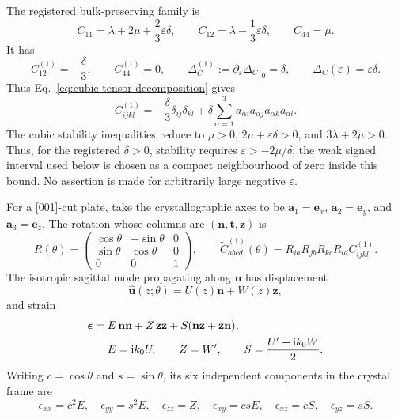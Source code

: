 The registered bulk-preserving family is
\begin{equation}
  C_{11}=\lambda+2\mu+\frac{2}{3}\varepsilon\delta,
  \qquad
  C_{12}=\lambda-\frac{1}{3}\varepsilon\delta,
  \qquad
  C_{44}=\mu.
  \label{eq:registered-cubic-family}
\end{equation}
It has
\begin{equation}
  C_{12}^{(1)}=-\frac{\delta}{3},
  \qquad
  C_{44}^{(1)}=0,
  \qquad
  \Delta_C^{(1)}
  :=\left.\partial_\varepsilon\Delta_C\right|_0=\delta,
  \qquad
  \Delta_C(\varepsilon)=\varepsilon\delta.
  \label{eq:cubic-family-derivatives}
\end{equation}
Thus Eq.~\eqref{eq:cubic-tensor-decomposition} gives
\begin{equation}
  C^{(1)}_{ijkl}
  =-\frac{\delta}{3}\delta_{ij}\delta_{kl}
   +\delta\sum_{\alpha=1}^{3}
      a_{\alpha i}a_{\alpha j}a_{\alpha k}a_{\alpha l}.
  \label{eq:registered-cubic-perturbation-tensor}
\end{equation}
The cubic stability inequalities reduce to
\(\mu>0\), \(2\mu+\varepsilon\delta>0\), and
\(3\lambda+2\mu>0\).  Thus, for the registered \(\delta>0\), stability
requires \(\varepsilon>-2\mu/\delta\); the weak signed interval used below is
chosen as a compact neighbourhood of zero inside this bound.  No assertion is
made for arbitrarily large negative \(\varepsilon\).

For a [001]-cut plate, take the crystallographic axes to be
\(\mathbf a_1=\mathbf e_x\),
\(\mathbf a_2=\mathbf e_y\), and
\(\mathbf a_3=\mathbf e_z\).  The rotation whose columns are
\((\mathbf n,\mathbf t,\mathbf z)\) is
\begin{equation}
  R(\theta)=
  \begin{pmatrix}
    \cos\theta&-\sin\theta&0\\
    \sin\theta& \cos\theta&0\\
    0&0&1
  \end{pmatrix},
  \qquad
  \widetilde C^{(1)}_{abcd}(\theta)
  =R_{ia}R_{jb}R_{kc}R_{ld}C^{(1)}_{ijkl}.
  \label{eq:cubic-tensor-rotation}
\end{equation}
The isotropic sagittal mode propagating along \(\mathbf n\) has displacement
\begin{equation}
  \widehat{\mathbf u}(z;\theta)
  =U(z)\mathbf n+W(z)\mathbf z,
  \label{eq:isotropic-sagittal-mode}
\end{equation}
and strain
\begin{align}
  \boldsymbol\epsilon
  ={}&E\,\mathbf n\mathbf n
   +Z\,\mathbf z\mathbf z
   +S(\mathbf n\mathbf z+\mathbf z\mathbf n),
  \notag\\
  &E=\mathrm{i}k_0U,
  \qquad
  Z=W',
  \qquad
  S=\frac{U'+\mathrm{i}k_0W}{2}.
  \label{eq:sagittal-strain-components}
\end{align}
Writing \(c=\cos\theta\) and \(s=\sin\theta\), its six independent
components in the crystal frame are
\begin{equation}
  \epsilon_{xx}=c^2E,
  \quad
  \epsilon_{yy}=s^2E,
  \quad
  \epsilon_{zz}=Z,
  \quad
  \epsilon_{xy}=csE,
  \quad
  \epsilon_{xz}=cS,
  \quad
  \epsilon_{yz}=sS.
  \label{eq:rotated-sagittal-strain}
\end{equation}

